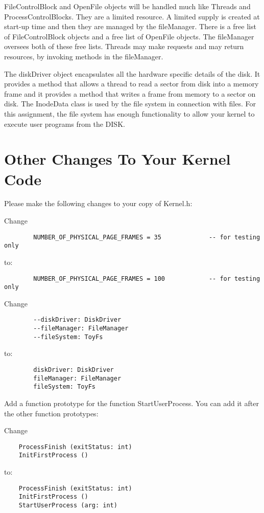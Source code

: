 \documentclass[12pt]{article}
\begin{document}
FileControlBlock and OpenFile objects will be handled much like
Threads and ProcessControlBlocks.  They are a limited resource.  A
limited supply is created at start-up time and then they are managed
by the fileManager.  There is a free list of FileControlBlock objects
and a free list of OpenFile objects.  The fileManager oversees both of
these free lists.  Threads may make requests and may return resources,
by invoking methods in the fileManager.

The diskDriver object encapsulates all the hardware specific details
of the disk.  It provides a method that allows a thread to read a
sector from disk into a memory frame and it provides a method that
writes a frame from memory to a sector on disk.   The InodeData class
is used by the file system in connection with files.  For this assignment,
the file system has enough functionality to allow your kernel to execute
user programs from the DISK.

\section{Other Changes To Your Kernel Code}

Please make the following changes to your copy of Kernel.h:

Change
\begin{verbatim}
        NUMBER_OF_PHYSICAL_PAGE_FRAMES = 35             -- for testing only
\end{verbatim}
to:
\begin{verbatim}
        NUMBER_OF_PHYSICAL_PAGE_FRAMES = 100            -- for testing only
\end{verbatim}

Change
\begin{verbatim}
        --diskDriver: DiskDriver
        --fileManager: FileManager
        --fileSystem: ToyFs
\end{verbatim}
to:
\begin{verbatim}
        diskDriver: DiskDriver
        fileManager: FileManager
        fileSystem: ToyFs
\end{verbatim}

Add a function prototype for the function StartUserProcess.  You can
add it after the other function prototypes:

\newpage
Change
\begin{verbatim}
    ProcessFinish (exitStatus: int)
    InitFirstProcess ()
\end{verbatim}
to:
\begin{verbatim}
    ProcessFinish (exitStatus: int)
    InitFirstProcess ()
    StartUserProcess (arg: int)
\end{verbatim}
\end{document}
